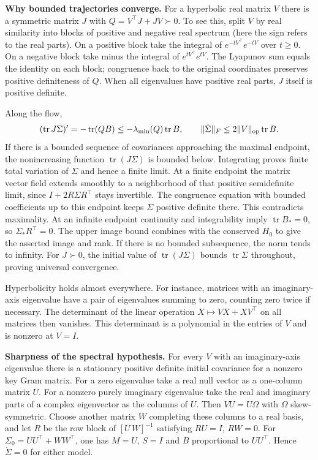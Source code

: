 \documentclass[11pt]{article}
\begin{document}
\textbf{Why bounded trajectories converge.} For a hyperbolic real matrix \(V\) there is a symmetric matrix \(J\) with \(Q=V^\top J+JV\succ0\). To see this, split \(V\) by real similarity into blocks of positive and negative real spectrum (here the sign refers to the real parts). On a positive block take the integral of \(e^{-tV^\top}e^{-tV}\) over \(t\geq0\). On a negative block take minus the integral of \(e^{tV^\top}e^{tV}\). The Lyapunov sum equals the identity on each block; congruence back to the original coordinates preserves positive definiteness of \(Q\). When all eigenvalues have positive real parts, \(J\) itself is positive definite.

Along the flow, \[
 (\operatorname{tr}J\Sigma)'=-\operatorname{tr}(QB)\leq-\lambda_{\min}(Q)\operatorname{tr}B,\qquad
 \|\dot\Sigma\|_F\leq2\|V\|_{\rm op}\operatorname{tr}B .
\] If there is a bounded sequence of covariances approaching the maximal endpoint, the nonincreasing function \(\operatorname{tr}(J\Sigma)\) is bounded below. Integrating proves finite total variation of \(\Sigma\) and hence a finite limit. At a finite endpoint the matrix vector field extends smoothly to a neighborhood of that positive semidefinite limit, since \(I+2R\Sigma R^\top\) stays invertible. The congruence equation with bounded coefficients up to this endpoint keeps \(\Sigma\) positive definite there. This contradicts maximality. At an infinite endpoint continuity and integrability imply \(\operatorname{tr}B_*=0\), so \(\Sigma_*R^\top=0\). The upper image bound combines with the conserved \(H_0\) to give the asserted image and rank. If there is no bounded subsequence, the norm tends to infinity. For \(J\succ0\), the initial value of \(\operatorname{tr}(J\Sigma)\) bounds \(\operatorname{tr}\Sigma\) throughout, proving universal convergence.

Hyperbolicity holds almost everywhere. For instance, matrices with an imaginary-axis eigenvalue have a pair of eigenvalues summing to zero, counting zero twice if necessary. The determinant of the linear operation \(X\mapsto VX+XV^\top\) on all matrices then vanishes. This determinant is a polynomial in the entries of \(V\) and is nonzero at \(V=I\).

\textbf{Sharpness of the spectral hypothesis.} For every \(V\) with an imaginary-axis eigenvalue there is a stationary positive definite initial covariance for a nonzero key Gram matrix. For a zero eigenvalue take a real null vector as a one-column matrix \(U\). For a nonzero purely imaginary eigenvalue take the real and imaginary parts of a complex eigenvector as the columns of \(U\). Then \(VU=U\Omega\) with \(\Omega\) skew-symmetric. Choose another matrix \(W\) completing these columns to a real basis, and let \(R\) be the row block of \([U\,W]^{-1}\) satisfying \(RU=I\), \(RW=0\). For \(\Sigma_0=UU^\top+WW^\top\), one has \(M=U\), \(S=I\) and \(B\) proportional to \(UU^\top\). Hence \(\dot\Sigma=0\) for either model.
\end{document}
